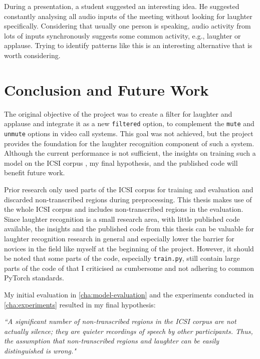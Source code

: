 \documentclass[bsc,frontabs,parskip,deptreport]{infthesis}
\begin{document}
During a presentation, a student suggested an interesting idea. He suggested constantly analysing all audio inputs of the meeting without looking for laughter specifically. Considering that usually one person is speaking, audio activity from lots of inputs synchronously suggests some common activity, e.g., laughter or applause. Trying to identify patterns like this is an interesting alternative that is worth considering. 

\chapter{Conclusion and Future Work}
The original objective of the project was to create a filter for laughter and applause and integrate it as a new \texttt{filtered} option, to complement the \texttt{mute} and \texttt{unmute} options in video call systems. This goal was not achieved, but the project provides the foundation for the laughter recognition component of such a system.
Although the current performance is not sufficient, the insights on training such a model on the ICSI corpus \citep{morgan2001meeting}, my final hypothesis, and the published code \citep{Wolter_A_Machine_Learning_2022} will benefit future work.

Prior research \citep{kennedy2004laughter,knox2006automatic, truong2005automatic} only used parts of the ICSI corpus for training and evaluation and discarded non-transcribed regions during preprocessing.
This thesis makes use of the whole ICSI corpus and includes non-transcribed regions in the evaluation. 
Since laughter recognition is a small research area, with little published code available, the insights and the published code \citep{Wolter_A_Machine_Learning_2022} from this thesis can be valuable for laughter recognition research in general and especially lower the barrier for novices in the field like myself at the beginning of the project.
However, it should be noted that some parts of the code, especially \verb|train.py|, still contain large parts of the code of \citet{gillick2021robust} that I criticised as cumbersome and not adhering to common PyTorch standards. 

My initial evaluation in \autoref{cha:model-evaluation} and the experiments conducted in \autoref{cha:experiments} resulted in my final hypothesis:

\textit{``A significant number of non-transcribed regions in the ICSI corpus are not actually silence; they are quieter recordings of speech by other participants. Thus, the assumption that non-transcribed regions and laughter can be easily distinguished is wrong."}
\end{document}
